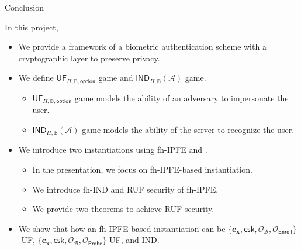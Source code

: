 \begin{frame}{Conclusion}

In this project,

\begin{itemize}
	\item<2-> We provide a framework of a biometric authentication scheme with a cryptographic layer to preserve privacy.

	\item<3-> We define $\textsf{UF}_{\Pi, \mathbb{B}, \textsf{option}}$ game and $\textsf{IND}_{\Pi, \mathbb{B}}(\mathcal{A})$ game.
	\begin{itemize}
		\item<4-> $\textsf{UF}_{\Pi, \mathbb{B}, \textsf{option}}$ game models the ability of an adversary to impersonate the user.
		\pause
		\item<5-> $\textsf{IND}_{\Pi, \mathbb{B}}(\mathcal{A})$ game models the ability of the server to recognize the user.
	\end{itemize}

	\item<6-> We introduce two instantiations using fh-IPFE and {}.
	\begin{itemize}
		\item<7-> In the presentation, we focus on fh-IPFE-based instantiation.
		\item<8-> We introduce \textsf{fh-IND} and \textsf{RUF} security of fh-IPFE.
		\item<9-> We provide two theorems to achieve \textsf{RUF} security. 
	\end{itemize}

	\item<10-> We show that how an fh-IPFE-based instantiation can be $\{ \mathbf{c_x}, \textsf{csk}, \mathcal{O}_\mathcal{B}, \mathcal{O}_{\textsf{Enroll}} \}$-UF, $\{ \mathbf{c_x}, \textsf{csk}, \mathcal{O}_\mathcal{B}, \mathcal{O}_{\textsf{Probe}} \}$-UF, and IND.

\end{itemize}


\end{frame}


